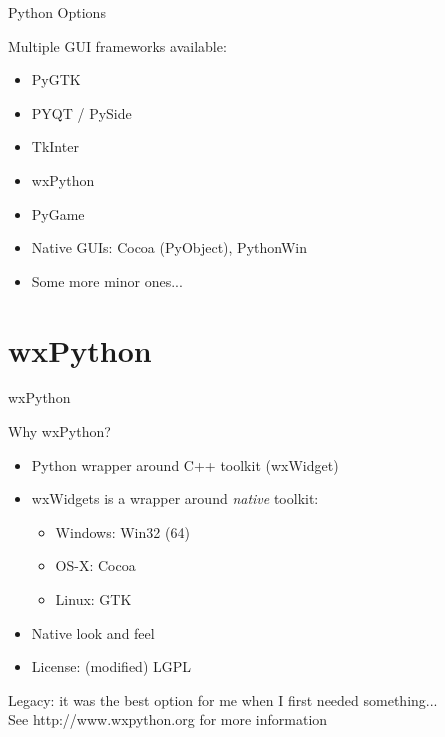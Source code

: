 \documentclass{beamer}
\begin{document}
\begin{frame}[fragile]{Python Options}

{\Large Multiple GUI frameworks available:}

\begin{itemize}
  \item PyGTK
  \item PYQT / PySide
  \item TkInter
  \item wxPython
  \item PyGame
  \item Native GUIs: Cocoa (PyObject), PythonWin
  \item Some more minor ones...
\end{itemize}

\end{frame}


\section{wxPython}

\begin{frame}[fragile]{wxPython}

{\Large Why wxPython?}

\begin{itemize}
  \item Python wrapper around C++ toolkit (wxWidget)
  \item wxWidgets is a wrapper around \emph{native} toolkit:
  \begin{itemize}
    \item Windows: Win32 (64)
    \item OS-X: Cocoa
    \item Linux: GTK
  \end{itemize}
  \item Native look and feel
  \item License: (modified) LGPL
\end{itemize}

\vfill
{\Large Legacy: it was the best option for me when I first needed something...}\\
See http://www.wxpython.org for more information

\end{frame}
\end{document}
